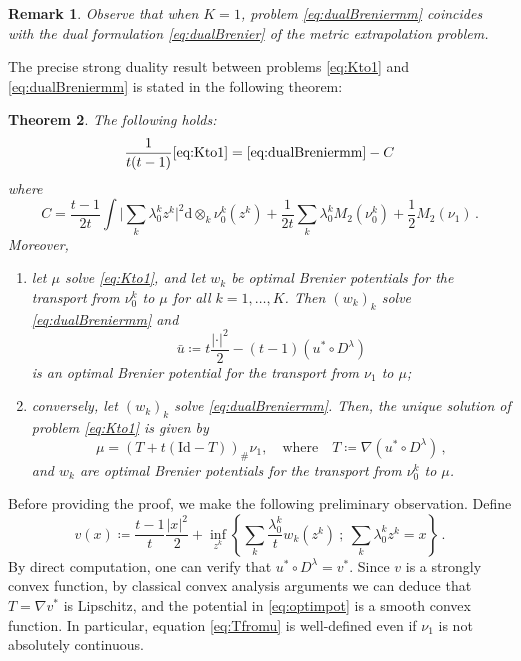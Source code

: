 \documentclass[12pt]{amsart}
\numberwithin{equation}{section}
\def\ed{\mathrm{d}}
\theoremstyle{plain}
\newtheorem{theorem}{Theorem}[section]
\newtheorem{remark}[theorem]{Remark}
\theoremstyle{definition}
\begin{document}
\begin{remark} Observe that when $K=1$, problem \eqref{eq:dualBreniermm} coincides with the dual formulation \eqref{eq:dualBrenier} of the metric extrapolation problem.
\end{remark}


The precise strong duality result between problems \eqref{eq:Kto1} and \eqref{eq:dualBreniermm} is stated in the following theorem:


\begin{theorem}\label{th:duality}
The following holds:
\begin{equation}\label{eq:PPstar}
\frac{1}{t(t-1)} \eqref{eq:Kto1} =  \eqref{eq:dualBreniermm}  - C
\end{equation}
where
\[
C = \frac{t-1}{2t}   \int \Big|\sum_k  \lambda_0^k {z^k} \Big|^2 \ed \otimes_k\nu_0^k(z^k) +
\frac{1}{2t}\sum_k \lambda_0^k M_2(\nu_0^k) + \frac{1}{2}  M_2(\nu_1)\,. \]
Moreover, 
\begin{enumerate}
\item let $\mu$ solve \eqref{eq:Kto1}, and let $w_k$ be optimal Brenier potentials for the transport from $\nu^k_0$ to $\mu$ for all $k = 1, \ldots,K$. Then $(w_k)_k$ solve \eqref{eq:dualBreniermm} and
\begin{equation}\label{eq:optimpot}
\bar{u} \coloneqq t\frac{|\cdot|^2}{2} - (t-1) (u^*\circ D^\lambda)
\end{equation}
is an optimal Brenier potential for the transport from $\nu_1$ to $\mu$;
\item conversely, let $(w_k)_k$ solve \eqref{eq:dualBreniermm}. Then, the unique solution of problem \eqref{eq:Kto1} is given by 
\begin{equation}\label{eq:Tfromu}
\mu = (T + t(\mathrm{Id} - T))_\# \nu_1, \quad \text{where}\quad T \coloneqq \nabla (u^*\circ D^\lambda )\,,
\end{equation}
and $w_k$ are optimal Brenier potentials for the transport from $\nu^k_0$ to $\mu$.
\end{enumerate}
\end{theorem}

Before providing the proof, we make the following preliminary observation. Define
\begin{equation}\label{eq:defv}
v(x) \coloneqq \frac{t-1}{t} \frac{|x|^2}{2} + \inf_{z^k}\left\{ \sum_k \frac{\lambda_0^k}t w_k(z^k) ~;~ \sum_k \lambda_0^k z^k = x\right\}\,.
\end{equation}
By direct computation, one can verify that $u^* \circ D^\lambda = v^*$. Since $v$ is a strongly convex function, by classical convex analysis arguments we can deduce that $T= \nabla v^*$ is Lipschitz, and the potential in \eqref{eq:optimpot} is a smooth convex function. In particular, equation \eqref{eq:Tfromu} is well-defined even if $\nu_1$ is not absolutely continuous.
\end{document}
